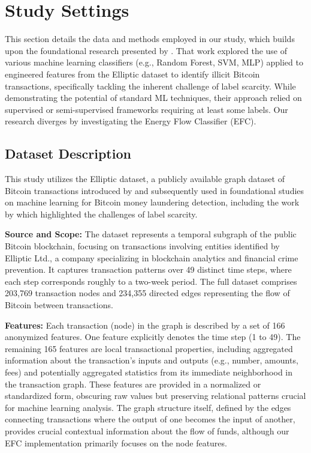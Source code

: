 \documentclass[12pt]{article}
\begin{document}
\section{Study Settings} \label{sec:methods}
This section details the data and methods employed in our study, which builds upon the foundational research presented
by \cite{lorenz2021machinelearningmethodsdetect}. That work explored the use of various machine learning classifiers
(e.g., Random Forest, SVM, MLP) applied to engineered features from the Elliptic dataset to identify illicit Bitcoin transactions,
specifically tackling the inherent challenge of label scarcity. While demonstrating the potential of standard ML techniques,
their approach relied on supervised or semi-supervised frameworks requiring at least some labels. Our research
diverges by investigating the Energy Flow Classifier (EFC). 

\subsection{Dataset Description} \label{subsec:dataset}

This study utilizes the Elliptic dataset, a publicly available graph dataset of Bitcoin transactions introduced by 
\cite{weber2019antimoneylaunderingbitcoinexperimenting} and subsequently used in foundational studies on machine
learning for Bitcoin money laundering detection, including the work by \cite{lorenz2021machinelearningmethodsdetect}
which highlighted the challenges of label scarcity.

\textbf{Source and Scope:} The dataset represents a temporal subgraph of the public Bitcoin blockchain, focusing on transactions
involving entities identified by Elliptic Ltd., a company specializing in blockchain analytics and financial crime prevention.
It captures transaction patterns over 49 distinct time steps, where each step corresponds roughly to a two-week period.
The full dataset comprises 203,769 transaction nodes and 234,355 directed edges representing the flow of Bitcoin between
transactions.

\textbf{Features:} Each transaction (node) in the graph is described by a set of 166 anonymized features. One feature
explicitly denotes the time step (1 to 49). The remaining 165 features are local transactional properties, including
aggregated information about the transaction's inputs and outputs (e.g., number, amounts, fees) and potentially aggregated
statistics from its immediate neighborhood in the transaction graph. These features are provided in a normalized or
standardized form, obscuring raw values but preserving relational patterns crucial for machine learning analysis. The
graph structure itself, defined by the edges connecting transactions where the output of one becomes the input of another,
provides crucial contextual information about the flow of funds, although our EFC implementation primarily focuses on the
node features.
\end{document}

